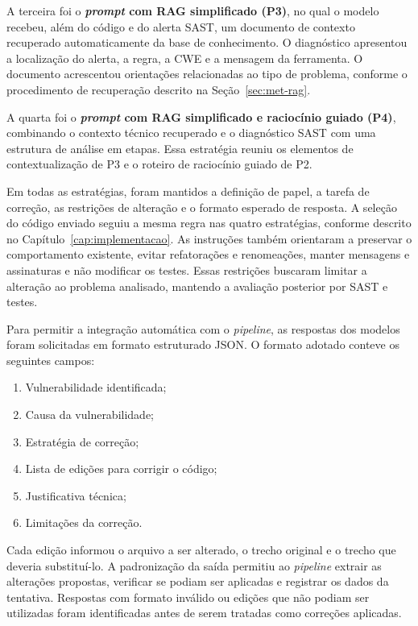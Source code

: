 A terceira foi o \textbf{\textit{prompt} com RAG simplificado (P3)}, no qual o modelo recebeu, além do código e do alerta SAST, um documento de contexto recuperado automaticamente da base de conhecimento. O diagnóstico apresentou a localização do alerta, a regra, a CWE e a mensagem da ferramenta. O documento acrescentou orientações relacionadas ao tipo de problema, conforme o procedimento de recuperação descrito na Seção~\ref{sec:met-rag}.

A quarta foi o \textbf{\textit{prompt} com RAG simplificado e raciocínio guiado (P4)}, combinando o contexto técnico recuperado e o diagnóstico SAST com uma estrutura de análise em etapas. Essa estratégia reuniu os elementos de contextualização de P3 e o roteiro de raciocínio guiado de P2.

Em todas as estratégias, foram mantidos a definição de papel, a tarefa de correção, as restrições de alteração e o formato esperado de resposta. A seleção do código enviado seguiu a mesma regra nas quatro estratégias, conforme descrito no Capítulo~\ref{cap:implementacao}. As instruções também orientaram a preservar o comportamento existente, evitar refatorações e renomeações, manter mensagens e assinaturas e não modificar os testes. Essas restrições buscaram limitar a alteração ao problema analisado, mantendo a avaliação posterior por SAST e testes.

Para permitir a integração automática com o \textit{pipeline}, as respostas dos modelos foram solicitadas em formato estruturado JSON. O formato adotado conteve os seguintes campos:

\begin{enumerate}
    \item Vulnerabilidade identificada;
    \item Causa da vulnerabilidade;
    \item Estratégia de correção;
    \item Lista de edições para corrigir o código;
    \item Justificativa técnica;
    \item Limitações da correção.
\end{enumerate}

Cada edição informou o arquivo a ser alterado, o trecho original e o trecho que deveria substituí-lo. A padronização da saída permitiu ao \textit{pipeline} extrair as alterações propostas, verificar se podiam ser aplicadas e registrar os dados da tentativa. Respostas com formato inválido ou edições que não podiam ser utilizadas foram identificadas antes de serem tratadas como correções aplicadas.


